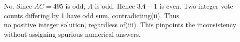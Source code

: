 No. Since $AC=495$ is odd, $A$ is odd. Hence $3A-1$ is even. Two integer vote counts differing by 1 have odd sum, contradicting(ii). Thus $\boxed{\text{no positive integer solution}}$, regardless of(iii). This pinpoints the inconsistency without assigning spurious numerical answers.
